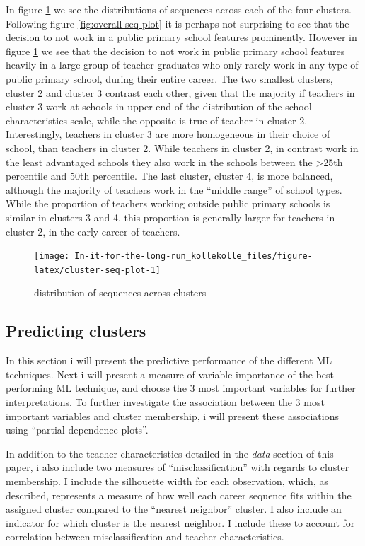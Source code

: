 \documentclass[
]{article}
\begin{document}
In figure \ref{fig:cluster-seq-plot} we see the distributions of sequences across each of the four clusters. Following figure \ref{fig:overall-seq-plot} it is perhaps not surprising to see that the decision to not work in a public primary school features prominently. However in figure \ref{fig:cluster-seq-plot} we see that the decision to not work in public primary school features heavily in a large group of teacher graduates who only rarely work in any type of public primary school, during their entire career. The two smallest clusters, cluster 2 and cluster 3 contrast each other, given that the majority if teachers in cluster 3 work at schools in upper end of the distribution of the school characteristics scale, while the opposite is true of teacher in cluster 2. Interestingly, teachers in cluster 3 are more homogeneous in their choice of school, than teachers in cluster 2. While teachers in cluster 2, in contrast work in the least advantaged schools they also work in the schools between the \textgreater25th percentile and 50th percentile. The last cluster, cluster 4, is more balanced, although the majority of teachers work in the ``middle range'' of school types.
While the proportion of teachers working outside public primary schools is similar in clusters 3 and 4, this proportion is generally larger for teachers in cluster 2, in the early career of teachers.

\begin{figure}[H]
\texttt{[image: In-it-for-the-long-run\_kollekolle\_files/figure-latex/cluster-seq-plot-1]} \caption{distribution of sequences across clusters}\label{fig:cluster-seq-plot}
\end{figure}

\hypertarget{predicting-clusters}{%
\subsection{Predicting clusters}\label{predicting-clusters}}

In this section i will present the predictive performance of the different ML techniques. Next i will present a measure of variable importance of the best performing ML technique, and choose the 3 most important variables for further interpretations. To further investigate the association between the 3 most important variables and cluster membership, i will present these associations using ``partial dependence plots''.

In addition to the teacher characteristics detailed in the \emph{data} section of this paper, i also include two measures of ``misclassification'' with regards to cluster membership. I include the silhouette width for each observation, which, as described, represents a measure of how well each career sequence fits within the assigned cluster compared to the ``nearest neighbor'' cluster. I also include an indicator for which cluster is the nearest neighbor. I include these to account for correlation between misclassification and teacher characteristics.
\end{document}
